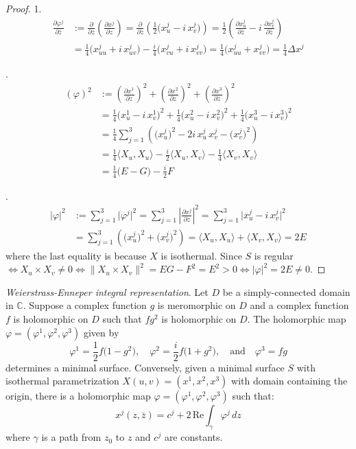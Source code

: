 \begin{proof}
1.
\begin{align*}
    \frac{\partial\varphi^j}{\partial\bar{z}} &:= \frac{\partial}{\partial\bar{z}}\left(\frac{\partial x^j}{\partial z}\right) = \frac{\partial}{\partial\bar{z}}\left(\frac{1}{2}\big(x_u^j - i\,x_v^j\big)\right) = \frac{1}{2}\left(\frac{\partial x_u^j}{\partial\bar{z}} - i\,\frac{\partial x_v^j}{\partial\bar{z}}\right)\\
    &= \frac{1}{4}\big(x_{uu}^j + i\,x_{uv}^j\big) - \frac{i}{4}\big(x_{vu}^j + i\,x_{vv}^j\big) = \frac{1}{4}\big(x_{uu}^j + x_{vv}^j\big) = \frac{1}{4}\Delta x^j
\end{align*}

.
\begin{align*}
    (\varphi)^2 &:= \left(\frac{\partial x^1}{\partial z}\right)^2 + \left(\frac{\partial x^2}{\partial z}\right)^2 + \left(\frac{\partial x^3}{\partial z}\right)^2\\
    &= \frac{1}{4}\big(x_u^1 - i\,x_v^1\big)^2 + \frac{1}{4}\big(x_u^2 - i\,x_v^2\big)^2 + \frac{1}{4}\big(x_u^3 - i\,x_v^3\big)^2\\
    &= \frac{1}{4}\sum_{j=1}^{3}\left(\big(x_u^j\big)^2 - 2i\,x_u^j\,x_v^j - \big(x_v^j\big)^2\right)\\
    &= \frac{1}{4}\big\langle X_u, X_u\big\rangle - \frac{i}{2}\big\langle X_u, X_v\big\rangle - \frac{1}{4}\big\langle X_v, X_v\big\rangle\\
    &= \frac{1}{4}\big(E - G\big) - \frac{i}{2}F
\end{align*}

.
\begin{align*}
    |\varphi|^2 &:= \sum_{j=1}^{3}\big|\varphi^j\big|^2 = \sum_{j=1}^{3}\left|\frac{\partial x^j}{\partial z}\right|^2 = \sum_{j=1}^{3}\big|x_u^j - i\,x_v^j\big|^2\\
    &= \sum_{j=1}^{3}\left(\big(x_u^j\big)^2 + \big(x_v^j\big)^2\right) = \big\langle X_u, X_u\big\rangle + \big\langle X_v, X_v\big\rangle = 2E
\end{align*}
where the last equality is because $X$ is isothermal. Since $S$ is regular $\iff X_u\times X_v\neq 0 \iff \big\|X_u\times X_v\big\|^2 = EG - F^2 = E^2 > 0 \iff |\varphi|^2 = 2E\neq 0$.
\end{proof}

\begin{theorem}
\textit{Weierstrass-Enneper integral representation}. Let $D$ be a simply-connected domain in $\mathbb{C}$. Suppose a complex function $g$ is meromorphic on $D$ and a complex function $f$ is holomorphic on $D$ such that $fg^2$ is holomorphic on $D$. The holomorphic map $\varphi = (\varphi^1, \varphi^2, \varphi^3)$ given by
\[
\varphi^1 = \frac{1}{2}f\big(1 - g^2\big), \quad \varphi^2 = \frac{i}{2}f\big(1 + g^2\big), \quad\text{and}\quad \varphi^3 = fg
\]
determines a minimal surface. Conversely, given a minimal surface $S$ with isothermal parametrization $X(u, v) = (x^1, x^2, x^3)$ with domain containing the origin, there is a holomorphic map $\varphi = (\varphi^1, \varphi^2, \varphi^3)$ such that:
\[
x^j(z, \bar{z}) = c^j + 2\,\mathrm{Re}\int_\gamma\varphi^j\,dz
\]
where $\gamma$ is a path from $z_0$ to $z$ and $c^j$ are constants.
\end{theorem}

